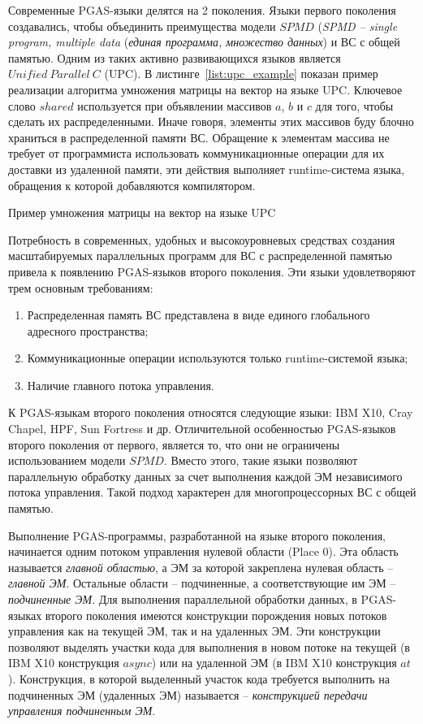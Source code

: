 Современные PGAS-языки делятся на 2 поколения. Языки первого поколения создавались, чтобы объединить преимущества модели $SPMD$ (\textit{SPMD -- single program, multiple data} (\textit{единая программа, множество данных}) и ВС с общей памятью. Одним из таких активно развивающихся языков является $Unified\ Parallel\ C$ (UPC). В листинге~\ref{list:upc_example} показан пример реализации алгоритма умножения матрицы на вектор на языке UPC. Ключевое слово $shared$ используется при объявлении массивов $a$, $b$ и $c$ для того, чтобы сделать их распределенными. Иначе говоря, элементы этих массивов буду блочно храниться в распределенной памяти ВС. Обращение к элементам массива не требует от программиста использовать коммуникационные операции для их доставки из удаленной памяти, эти действия выполняет runtime-система языка, обращения к которой добавляются компилятором.

\begin{ListingEnv}[!h]
	
    \caption{Пример умножения матрицы на вектор на языке UPC}
    \label{list:upc_example}
\end{ListingEnv}

Потребность в современных, удобных и высокоуровневых средствах создания масштабируемых параллельных программ для ВС с распределенной памятью привела к появлению PGAS-языков второго поколения. Эти языки удовлетворяют трем основным требованиям:
\begin{enumerate}
\item Распределенная память ВС представлена в виде единого глобального адресного пространства;
\item Коммуникационные операции используются только runtime-системой языка;
\item Наличие главного потока управления.
\end{enumerate}

К PGAS-языкам второго поколения относятся следующие языки: IBM X10, Cray Chapel, HPF, Sun Fortress и др. Отличительной особенностью PGAS-языков второго поколения от первого, является то, что они не ограничены использованием модели $SPMD$. Вместо этого, такие языки позволяют параллельную обработку данных за счет выполнения каждой ЭМ независимого потока управления. Такой подход характерен для многопроцессорных ВС с общей памятью.

Выполнение PGAS-программы, разработанной на языке второго поколения, начинается одним потоком управления нулевой области (Place 0). Эта область называется \textit{главной областью}, а ЭМ за которой закреплена нулевая область -- \textit{главной ЭМ}. Остальные области -- подчиненные, а соответствующие им ЭМ -- \textit{подчиненные ЭМ}. Для выполнения параллельной обработки данных, в PGAS-языках второго поколения имеются конструкции порождения новых потоков управления как на текущей ЭМ, так и на удаленных ЭМ. Эти конструкции позволяют выделять участки кода для выполнения в новом потоке на текущей (в IBM X10 конструкция $async$) или на удаленной ЭМ (в IBM X10 конструкция $at$). Конструкция, в которой выделенный участок кода требуется выполнить на подчиненных ЭМ (удаленных ЭМ) называется -- \textit{конструкцией передачи управления подчиненным ЭМ}. 

